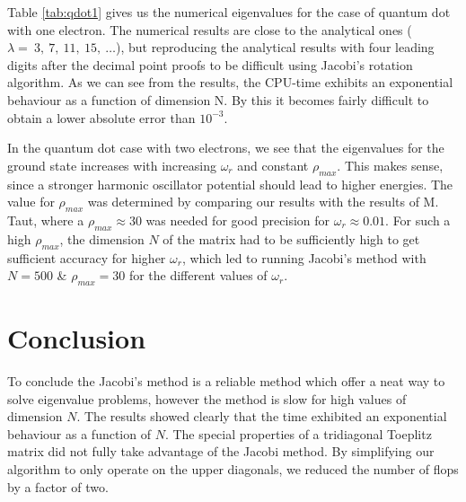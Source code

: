 \documentclass[twoside,onecolumn]{article}
\begin{document}
\bigskip



Table \ref{tab:qdot1} gives us the numerical eigenvalues for the case of quantum dot with one electron. The numerical results are close to the analytical ones ($\lambda =\ 3,\ 7,\ 11,\ 15,\ \dots$), but reproducing the analytical results with four leading digits after the decimal point proofs to be difficult using Jacobi's rotation algorithm. As we can see from the results, the CPU-time exhibits an exponential behaviour as a function of dimension N. By this it becomes fairly difficult to obtain a lower absolute error than $10^{-3}$.  

\bigskip

In the quantum dot case with two electrons, we see that the eigenvalues for the ground state increases with increasing $\omega_r$ and constant $\rho_{max}$. This makes sense, since a stronger harmonic oscillator potential should lead to higher energies. The value for $\rho_{max}$ was determined by comparing our results with the results of M. Taut\cite{taut}, where a $\rho_{max}\approx30$ was needed for good precision for $\omega_r\approx0.01$. For such a high $\rho_{max}$, the dimension $N$ of the matrix had to be sufficiently high to get sufficient accuracy for higher $\omega_r$, which led to running Jacobi's method with $N=500$ \& $\rho_{max}=30$ for the different values of $\omega_r$.\\



\section{Conclusion}


To conclude the Jacobi's method is a reliable method which offer a neat way to solve eigenvalue problems, however the method is slow for high values of dimension $N$. The results showed clearly that the time exhibited an exponential behaviour as a function of $N$. The special properties of a tridiagonal Toeplitz matrix did not fully take advantage of the Jacobi method. By simplifying our algorithm to only operate on the upper diagonals, we reduced the number of flops by a factor of two.\\
\end{document}
